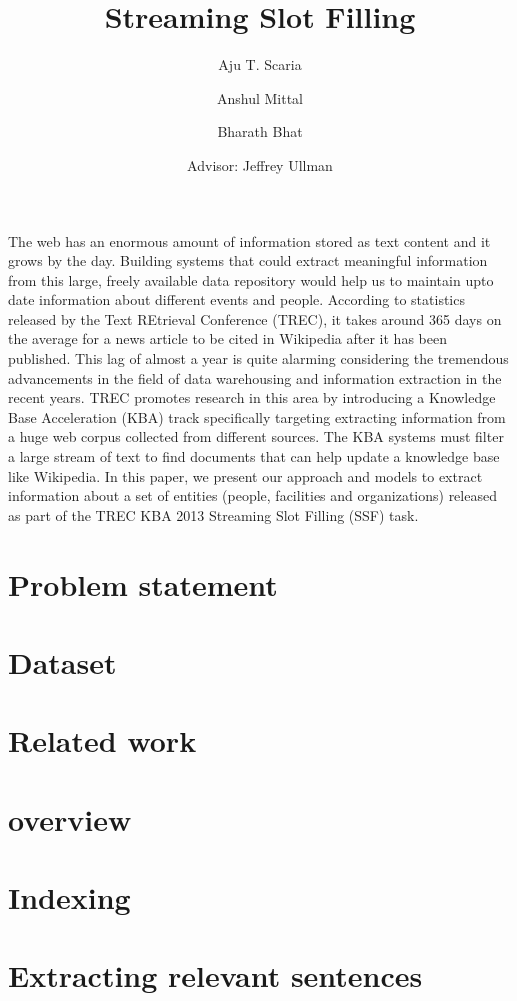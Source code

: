 \documentclass[letterpaper]{article}
\begin{document}
\title{Streaming Slot Filling}
\author{Aju T. Scaria \and Anshul Mittal \and Bharath Bhat \\
 {  }\and Advisor: Jeffrey Ullman \and {  }}
\renewcommand{\today}{June 10, 2013}
\maketitle
The web has an enormous amount of information stored as text content and it grows by the day. Building systems that could  extract meaningful information from this large, freely available data repository would help us to maintain upto date information about different events and people. According to statistics released by the Text REtrieval Conference (TREC), it takes around 365 days on the average for a news article to be cited in Wikipedia after it has been published. This lag of almost a year is quite alarming considering the tremendous advancements in the field of data warehousing and information extraction in the recent years. TREC promotes research in this area by introducing a Knowledge Base Acceleration (KBA) track specifically targeting extracting information from a huge web corpus collected from different sources. The KBA systems must filter a large stream of text to find documents that can help update a knowledge base like Wikipedia. In this paper, we present our approach and models to extract information about a set of entities (people, facilities and organizations) released as part of the TREC KBA 2013 Streaming Slot Filling (SSF) task.
\section{Problem statement}

\section{Dataset}

\section{Related work}

\section{overview}

\section{Indexing}

\section{Extracting relevant sentences}

\end{document}
